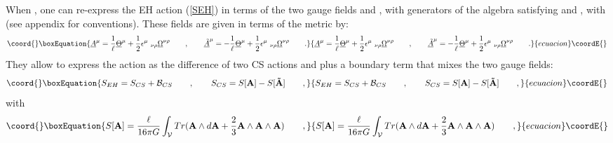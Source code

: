 \documentclass[a4paper,10pt]{article}
\begin{document}
When \coordHE{}, one can re-express \cite{ATW} the EH action (\ref{SEH})  
in terms of 
the two gauge fields  
\coordHE{} 
and 
\coordHE{},  
with \coordHE{} 
generators of the \coordHE{} algebra satisfying  
\coordHE{} and  
\coordHE{},  
with \coordHE{} (see appendix for conventions).  
These fields are given in terms of the metric by: 
\begin{equation}\coord{}\boxEquation{ 
\label{ATHOM} 
\underline{A}^{ \mu} = \frac 1 \ell \underline{\Theta}^{ \mu} + 
{1\over 2} \epsilon^{ \mu}\ _{ 
\nu\rho} \underline{\Omega}^{ \nu  \rho}  \qquad , \qquad 
\underline{\tilde A}^{ \mu} = - \frac 1 \ell \underline{\Theta}^{ \mu} + 
{1\over 2} \epsilon^{ \mu}\ _{ 
\nu\rho} \underline{\Omega}^{ \nu  \rho} \qquad  . 
}{ 
\underline{A}^{ \mu} = \frac 1 \ell \underline{\Theta}^{ \mu} + 
{1\over 2} \epsilon^{ \mu}\ _{ 
\nu\rho} \underline{\Omega}^{ \nu  \rho}  \qquad , \qquad 
\underline{\tilde A}^{ \mu} = - \frac 1 \ell \underline{\Theta}^{ \mu} + 
{1\over 2} \epsilon^{ \mu}\ _{ 
\nu\rho} \underline{\Omega}^{ \nu  \rho} \qquad  . 
}{ecuacion}\coordE{}\end{equation} 
They allow to express the action \coordHE{} as the 
difference of two CS actions \coordHE{} and \coordHE{}  
plus a boundary term that mixes the two gauge fields: 
\begin{equation}\coord{}\boxEquation{ 
\label{SCS} 
S_{EH}= S_{CS} + {\cal B}_{CS} 
\qquad , \qquad
S_{CS}=S[{\bf A}] - S[{\bf \tilde A}] \qquad , 
}{ 
S_{EH}= S_{CS} + {\cal B}_{CS} 
\qquad , \qquad
S_{CS}=S[{\bf A}] - S[{\bf \tilde A}] \qquad , 
}{ecuacion}\coordE{}\end{equation} 
with 
\begin{equation}\coord{}\boxEquation{ 
\label{SA} 
S[{\bf A}] = \frac {\ell} {16 \pi G} \int_{\cal V} 
 Tr({\bf A}\wedge d{\bf A} + {2\over 3} {\bf 
  A}\wedge {\bf A} \wedge {\bf A}) \qquad , 
}{ 
S[{\bf A}] = \frac {\ell} {16 \pi G} \int_{\cal V} 
 Tr({\bf A}\wedge d{\bf A} + {2\over 3} {\bf 
  A}\wedge {\bf A} \wedge {\bf A}) \qquad , 
}{ecuacion}\coordE{}\end{equation} 
\end{document}
